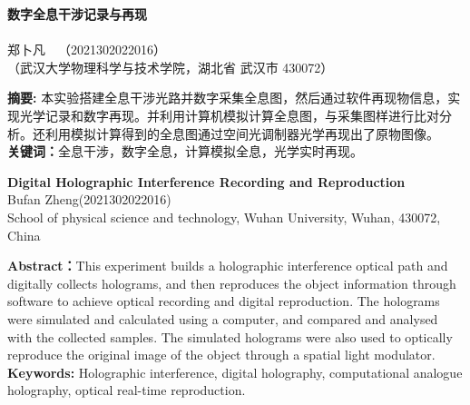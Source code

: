 \documentclass{WHUReport}
\newcommand{\name}{郑卜凡}
\newcommand{\stuid}{2021302022016}
\newcommand{\Name}{Bufan Zheng}
\newcommand{\newtitle}{数字全息干涉记录与再现}
\newcommand{\Title}{Digital Holographic Interference Recording and Reproduction}
\begin{document}
\pagestyle{maincontent} 
%

\begin{center}
 \textbf{\newtitle}\\
~\\
 \kaishu \name \ \ （\stuid）\\
 \kaishu （武汉大学物理科学与技术学院，湖北省 武汉市 430072）\\
\end{center}
\textbf{摘\quad 要:}
本实验搭建全息干涉光路并数字采集全息图，然后通过软件再现物信息，实现光学记录和数字再现。并利用计算机模拟计算全息图，与采集图样进行比对分析。还利用模拟计算得到的全息图通过空间光调制器光学再现出了原物图像。\\
\textbf{关键词：}全息干涉，数字全息，计算模拟全息，光学实时再现。
~\\
\begin{center}
	\textbf{\Title}\\
	 \Name\quad (\stuid)\\
	 School of physical science and technology, Wuhan University, Wuhan, 430072, China
\end{center}

\textbf{Abstract：}This experiment builds a holographic interference optical path and digitally collects holograms, and then reproduces the object information through software to achieve optical recording and digital reproduction. The holograms were simulated and calculated using a computer, and compared and analysed with the collected samples. The simulated holograms were also used to optically reproduce the original image of the object through a spatial light modulator.\\
\textbf{Keywords: }Holographic interference, digital holography, computational analogue holography, optical real-time reproduction.
\end{document}
